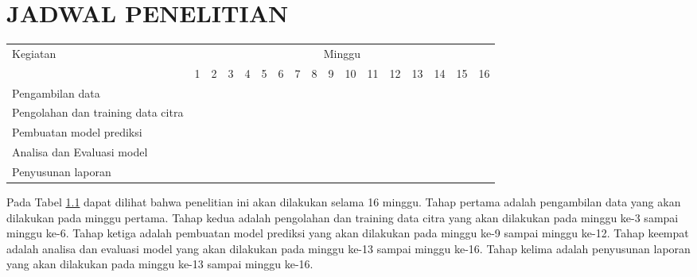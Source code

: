 \chapter{JADWAL PENELITIAN}

\newcommand{\w}{}
\newcommand{\G}{\cellcolor{gray}}
\begin{table}[H]
  \label{tbl:timeline}
  \begin{tabular}{|p{3.5cm}|c|c|c|c|c|c|c|c|c|c|c|c|c|c|c|c|}

    \hline
    \multirow{2}{*}{Kegiatan}          & \multicolumn{16}{|c|}{Minggu}                                                                       \\
    \cline{2-17}                       &
    1                                  & 2                             & 3  & 4  & 5  & 6  & 7  & 8  & 9  & 10 & 11 & 12 & 13 & 14 & 15 & 16 \\
    \hline

    Pengambilan data                   &
    \G                                 & \G                            & \w & \w & \w & \w & \w & \w & \w & \w & \w & \w & \w & \w & \w & \w \\
    \hline

    Pengolahan dan training data citra &
    \w                                 & \w                            & \G & \G & \G & \G & \G & \G & \w & \w & \w & \w & \w & \w & \w & \w \\
    \hline

    Pembuatan model prediksi           &
    \w                                 & \w                            & \w & \w & \w & \w & \w & \w & \G & \G & \G & \G & \w & \w & \w & \w \\
    \hline

    Analisa dan Evaluasi model         &
    \w                                 & \w                            & \w & \w & \w & \w & \w & \w & \w & \w & \w & \G & \G & \G & \G & \w \\
    \hline

    Penyusunan laporan                 &
    \w                                 & \w                            & \w & \w & \w & \w & \w & \w & \w & \w & \G & \G & \G & \G & \G & \G \\
    \hline
  \end{tabular}
\end{table}

Pada Tabel \ref{tbl:timeline} dapat dilihat bahwa penelitian ini akan dilakukan selama 16 minggu. Tahap pertama adalah pengambilan data yang akan dilakukan pada minggu pertama. Tahap kedua adalah pengolahan dan training data citra yang akan dilakukan pada minggu ke-3 sampai minggu ke-6. Tahap ketiga adalah pembuatan model prediksi yang akan dilakukan pada minggu ke-9 sampai minggu ke-12. Tahap keempat adalah analisa dan evaluasi model yang akan dilakukan pada minggu ke-13 sampai minggu ke-16. Tahap kelima adalah penyusunan laporan yang akan dilakukan pada minggu ke-13 sampai minggu ke-16.
